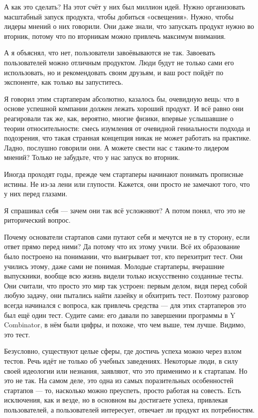 \documentclass[ebook,12pt,oneside,openany]{memoir}
\begin{document}
А как это сделать? На этот счёт у них был миллион идей. Нужно
организовать масштабный запуск продукта, чтобы добиться «освещения».
Нужно, чтобы лидеры мнений о них говорили. Они даже знали, что
запускать продукт нужно во вторник, потому что по вторникам можно
привлечь максимум внимания. \newline

А я объяснял, что нет, пользователи завоёвываются не так. Завоевать
пользователей можно отличным продуктом. Люди будут не только сами его
использовать, но и рекомендовать своим друзьям, и ваш рост пойдёт по
экспоненте, как только вы запуститесь. \newline

Я говорил этим стартаперам абсолютно, казалось бы, очевидную вещь: что
в основе успешной компании должен лежать хороший продукт. И всё равно
они реагировали так же, как, вероятно, многие физики, впервые
услышавшие о теории относительности: смесь изумления от очевидной
гениальности подхода и подозрения, что такая странная концепция никак
не может работать на практике. Ладно, послушно говорили они. А можете
свести нас с таким-то лидером мнений? Только не забудьте, что у нас
запуск во вторник. \newline

Иногда проходят годы, прежде чем стартаперы начинают понимать
прописные истины. Не из-за лени или глупости. Кажется, они просто не
замечают того, что у них перед глазами. \newline

Я спрашивал себя — зачем они так всё усложняют? А потом понял, что это
не риторический вопрос. \newline

Почему основатели стартапов сами путают себя и мечутся не в ту
сторону, если ответ прямо перед ними? Да потому что их этому учили.
Всё их образование было построено на понимании, что выигрывает тот,
кто перехитрит тест. Они учились этому, даже сами не понимая. Молодые
стартаперы, вчерашние выпускники, вообще всю жизнь видели только
искусственно созданные тесты. Они считали, что просто это мир так
устроен: первым делом, видя перед собой любую задачу, они пытались
найти лазейку и обхитрить тест. Поэтому разговор всегда начинался с
вопроса, как привлечь средства — для этих стартаперов это был ещё один
тест. Судите сами: его давали по завершении программы в Y Combinator,
в нём были цифры, и похоже, что чем выше, тем лучше. Видимо, это тест. \newline

Безусловно, существуют целые сферы, где достичь успеха можно через
взлом тестов. Речь идёт не только об учебных заведениях. Некоторые
люди, в силу своей идеологии или незнания, заявляют, что это применимо
и к стартапам. Но это не так. На самом деле, это одна из самых
поразительных особенностей стартапов — то, насколько можно преуспеть,
просто работая на совесть. Есть исключения, как и везде, но в основном
вы достигаете успеха, привлекая пользователей, а пользователей
интересует, отвечает ли продукт их потребностям. \newline
\end{document}
